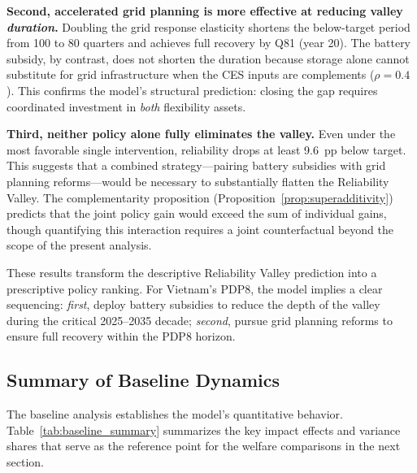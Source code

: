 \documentclass[12pt, a4paper]{article}
\begin{document}
\textbf{Second, accelerated grid planning is more effective at reducing valley \textit{duration}.} Doubling the grid response elasticity shortens the below-target period from 100 to 80 quarters and achieves full recovery by Q81 (year 20). The battery subsidy, by contrast, does not shorten the duration because storage alone cannot substitute for grid infrastructure when the CES inputs are complements ($\rho = 0.4$). This confirms the model's structural prediction: closing the gap requires coordinated investment in \textit{both} flexibility assets.

\textbf{Third, neither policy alone fully eliminates the valley.} Even under the most favorable single intervention, reliability drops at least 9.6~pp below target. This suggests that a combined strategy---pairing battery subsidies with grid planning reforms---would be necessary to substantially flatten the Reliability Valley. The complementarity proposition (Proposition~\ref{prop:superadditivity}) predicts that the joint policy gain would exceed the sum of individual gains, though quantifying this interaction requires a joint counterfactual beyond the scope of the present analysis.

These results transform the descriptive Reliability Valley prediction into a prescriptive policy ranking. For Vietnam's PDP8, the model implies a clear sequencing: \textit{first}, deploy battery subsidies to reduce the depth of the valley during the critical 2025--2035 decade; \textit{second}, pursue grid planning reforms to ensure full recovery within the PDP8 horizon.

\subsection{Summary of Baseline Dynamics}

The baseline analysis establishes the model's quantitative behavior. Table~\ref{tab:baseline_summary} summarizes the key impact effects and variance shares that serve as the reference point for the welfare comparisons in the next section.
\end{document}
